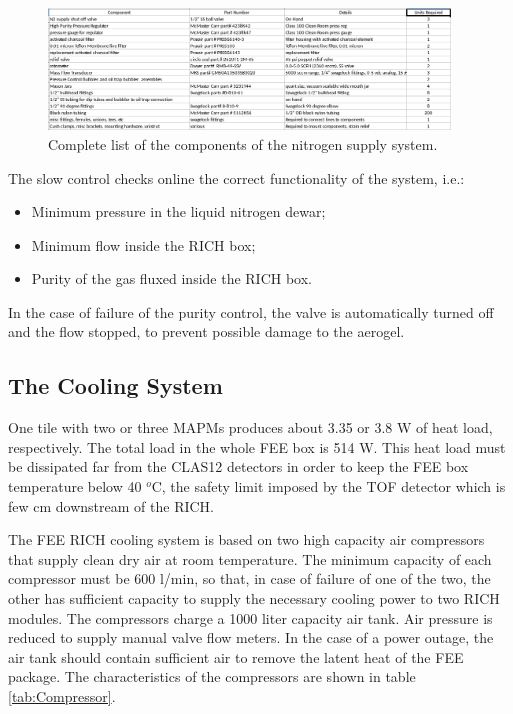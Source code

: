 \documentclass[12pt]{article}
\begin{document}
\begin{figure}[h!]
\center
\includegraphics[width=0.95\textwidth]{N2_components.jpg}
\caption{ \label{fig:N2_components} Complete list of the components of the nitrogen supply system.}
\end{figure}



The slow control checks online the correct functionality of the system, i.e.:
\begin{itemize}
\item{Minimum pressure in the liquid nitrogen dewar;}
\item{Minimum flow inside the RICH box;}
\item{Purity of the gas fluxed inside the RICH box.}
\end{itemize}
In the case of failure of the purity control, the valve is automatically turned off and the flow stopped, to prevent possible damage to the aerogel.



\subsection{The Cooling System}

One tile with two or three MAPMs produces about 3.35 or 3.8 W of heat load, respectively.
The total load in the whole FEE box is 514 W.
This heat load must be dissipated far from the CLAS12 detectors in order to keep the FEE box temperature below 40 $^o$C, the safety limit imposed by the TOF detector which is few cm downstream of the RICH.

The FEE RICH cooling system is based on two high capacity air compressors that supply clean dry air at room temperature.
The minimum capacity of each compressor must be 600 l/min, so that, in case of failure of one of the two, the other has sufficient capacity to supply the necessary cooling power to two RICH modules.
The compressors charge a 1000 liter capacity air tank.
Air pressure is reduced to supply manual valve flow meters.
In the case of a power outage, the air tank should contain sufficient air to remove the latent heat of the FEE package.
The characteristics of the compressors are shown in table \ref{tab:Compressor}.
\end{document}

